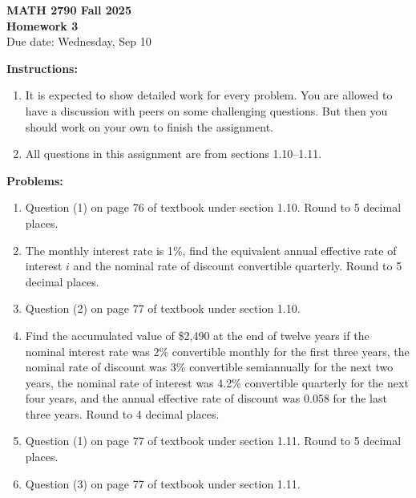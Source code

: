 \documentclass[12pt]{article}
\begin{document}
\begin{center}
\textbf{\Large MATH 2790 Fall 2025}\\[1em]
\textbf{\Large Homework 3}\\[0.5em]
Due date: Wednesday, Sep 10
\end{center}

\bigskip

\textbf{Instructions:}

\begin{enumerate}[label=(\alph*)]
\item It is expected to show detailed work for every problem. You are allowed to have a
discussion with peers on some challenging questions. But then you should work on
your own to finish the assignment.

\item All questions in this assignment are from sections 1.10–1.11.
\end{enumerate}

\bigskip

\textbf{Problems:}

\begin{enumerate}
\item Question (1) on page 76 of textbook under section 1.10. Round to 5 decimal places.

\item The monthly interest rate is 1\%, find the equivalent annual effective rate of interest $i$
and the nominal rate of discount convertible quarterly. Round to 5 decimal places.

\item Question (2) on page 77 of textbook under section 1.10.

\item Find the accumulated value of \$2{,}490 at the end of twelve years if the nominal interest
rate was 2\% convertible monthly for the first three years, the nominal rate of discount was 3\%
convertible semiannually for the next two years, the nominal rate of interest was 4.2\%
convertible quarterly for the next four years, and the annual effective rate of discount was
0.058 for the last three years. Round to 4 decimal places.

\item Question (1) on page 77 of textbook under section 1.11. Round to 5 decimal places.

\item Question (3) on page 77 of textbook under section 1.11.
\end{enumerate}
\end{document}
